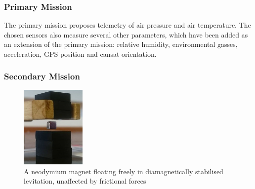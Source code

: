 \documentclass{report}
\begin{document}
		\subsubsection{Primary Mission}
		The primary mission proposes telemetry of air pressure and
		air temperature. The chosen sensors also measure 
		several other parameters, 
		which have been added as an extension of the primary mission: relative
		humidity, environmental gasses, acceleration, GPS position and cansat
		orientation.

		\subsubsection{Secondary Mission}

		\begin{figure}
			\vspace{-32.5pt}
	 		\begin{center}
			\includegraphics[width=0.28\textwidth]{floatingMagnet}
			\end{center}
			\vspace{-15pt}
			\caption{A neodymium magnet floating freely in diamagnetically
			stabilised levitation, unaffected by frictional forces}
		\end{figure}
\end{document}
